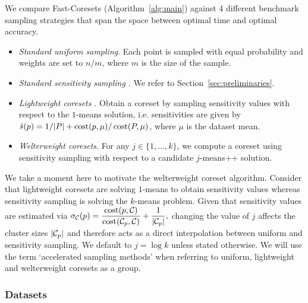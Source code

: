 We compare Fast-Coresets (Algorithm~\ref{alg:main}) against 4 different benchmark sampling strategies that span the space between optimal time and optimal
accuracy.
\begin{itemize}
        \item \emph{Standard uniform sampling}. Each point is sampled with equal probability and weights are set to $n / m$, where $m$ is the size of the sample.
        \item \emph{Standard sensitivity sampling \cite{LS10}}. We refer to Section~\ref{sec:preliminaries}.
        \item \emph{Lightweight coresets \cite{bachem2018scalable}}. Obtain a coreset by sampling sensitivity values with respect to the $1$-means solution,
            i.e. sensitivities are given by $\hat{s}(p) = 1/|P| + \operatorname{cost}(p, \mu) / \operatorname{cost}(P, \mu)$, where $\mu$ is the dataset mean.
        \item \emph{Welterweight coresets}. For any $j \in \{1,..., k\}$, we compute a coreset using sensitivity sampling with respect to a candidate
            $j$-means++ solution.
\end{itemize}

We take a moment here to motivate the welterweight coreset algorithm.  Consider that lightweight coresets are solving $1$-means to obtain sensitivity
values whereas sensitivity sampling is solving the $k$-means problem. Given that sensitivity values are estimated via $ \sigma_\mathcal C(p) = \dfrac{\operatorname{cost}(p,
\mathcal C)}{\operatorname{cost}(\mathcal C_{p}, \mathcal C)} + \dfrac{1}{|\mathcal C_p|},$ changing the value of $j$ affects the cluster sizes $|\mathcal C_p|$ and therefore acts as a direct
interpolation between uniform and sensitivity sampling.  We default to $j = \log k$ unless stated otherwise. We will use the term `accelerated sampling methods'
when referring to uniform, lightweight and welterweight coresets as a group.

\subsubsection{Datasets}
\label{sssec:datasets}

